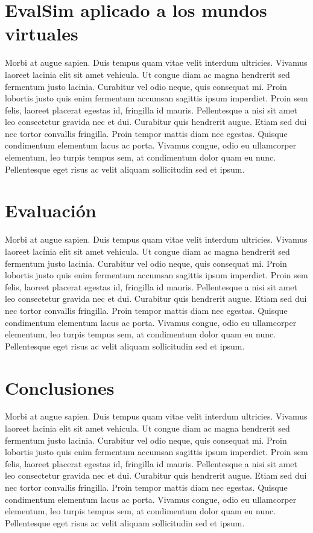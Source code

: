 \section{EvalSim aplicado a los mundos virtuales}

Morbi at augue sapien. Duis tempus quam vitae velit interdum ultricies. Vivamus laoreet lacinia elit sit amet vehicula. Ut congue diam ac magna hendrerit sed fermentum justo lacinia. Curabitur vel odio neque, quis consequat mi. Proin lobortis justo quis enim fermentum accumsan sagittis ipsum imperdiet. Proin sem felis, laoreet placerat egestas id, fringilla id mauris. Pellentesque a nisi sit amet leo consectetur gravida nec et dui. Curabitur quis hendrerit augue. Etiam sed dui nec tortor convallis fringilla. Proin tempor mattis diam nec egestas. Quisque condimentum elementum lacus ac porta. Vivamus congue, odio eu ullamcorper elementum, leo turpis tempus sem, at condimentum dolor quam eu nunc. Pellentesque eget risus ac velit aliquam sollicitudin sed et ipsum. 

\section{Evaluación}

Morbi at augue sapien. Duis tempus quam vitae velit interdum ultricies. Vivamus laoreet lacinia elit sit amet vehicula. Ut congue diam ac magna hendrerit sed fermentum justo lacinia. Curabitur vel odio neque, quis consequat mi. Proin lobortis justo quis enim fermentum accumsan sagittis ipsum imperdiet. Proin sem felis, laoreet placerat egestas id, fringilla id mauris. Pellentesque a nisi sit amet leo consectetur gravida nec et dui. Curabitur quis hendrerit augue. Etiam sed dui nec tortor convallis fringilla. Proin tempor mattis diam nec egestas. Quisque condimentum elementum lacus ac porta. Vivamus congue, odio eu ullamcorper elementum, leo turpis tempus sem, at condimentum dolor quam eu nunc. Pellentesque eget risus ac velit aliquam sollicitudin sed et ipsum. 

\section{Conclusiones}

Morbi at augue sapien. Duis tempus quam vitae velit interdum ultricies. Vivamus laoreet lacinia elit sit amet vehicula. Ut congue diam ac magna hendrerit sed fermentum justo lacinia. Curabitur vel odio neque, quis consequat mi. Proin lobortis justo quis enim fermentum accumsan sagittis ipsum imperdiet. Proin sem felis, laoreet placerat egestas id, fringilla id mauris. Pellentesque a nisi sit amet leo consectetur gravida nec et dui. Curabitur quis hendrerit augue. Etiam sed dui nec tortor convallis fringilla. Proin tempor mattis diam nec egestas. Quisque condimentum elementum lacus ac porta. Vivamus congue, odio eu ullamcorper elementum, leo turpis tempus sem, at condimentum dolor quam eu nunc. Pellentesque eget risus ac velit aliquam sollicitudin sed et ipsum. 









